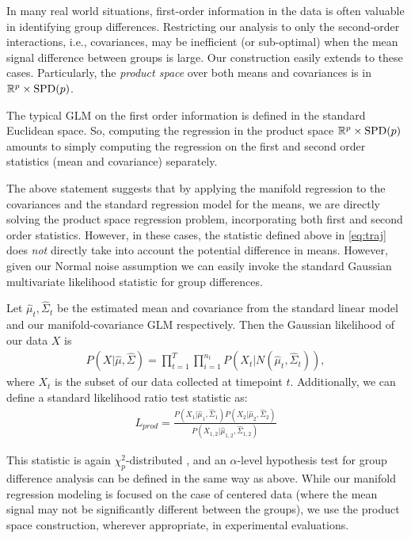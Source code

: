In many real world situations, first-order information in the data is often valuable in identifying group differences. Restricting 
our analysis to only the second-order interactions, i.e., covariances, may be inefficient (or sub-optimal) when the mean signal difference between groups is large. Our construction easily extends to these cases. Particularly, the \textit{product space} over both means and covariances is in $\mathbb{R}^{p} \times \text{SPD}{(p)}$. 
\begin{remark}
The typical GLM on the first order information is defined in the standard Euclidean space. So, computing the regression in the product space 
$\mathbb{R}^{p} \times \text{SPD}{(p)}$ 
amounts to simply 
computing the regression on the first and second order statistics (mean and covariance) separately.
\end{remark}
The above statement suggests that by applying the manifold regression to the covariances and the standard regression model for the means, 
we are directly solving the product space regression problem, incorporating both first and second order statistics.
However, in these cases, the statistic defined above in \eqref{eq:traj} does {\em not} directly take into account the potential difference in means. 
However, given our Normal noise assumption we can easily invoke the standard Gaussian multivariate likelihood statistic for group differences.
\begin{definition}
Let $\hat{\mu}_t, \hat{\Sigma}_t$ be the estimated mean and covariance from the standard linear model and our manifold-covariance GLM respectively. Then the Gaussian likelihood of our data $X$ is
\begin{align}
P(X|\hat{\mu},\hat{\Sigma}) = \prod_{t=1}^{T}\prod_{i=1}^{n_t} P(X_t | N(\hat{\mu}_t,\hat{\Sigma}_t)),
\end{align}
where $X_t$ is the subset of our data collected at timepoint $t$. Additionally, we can define a standard likelihood ratio test statistic as:
\begin{align}
L_{prod} = \frac{P(X_1|\hat{\mu}_1,\hat{\Sigma}_1)P(X_2|\hat{\mu}_2,\hat{\Sigma}_2)}{P(X_{1,2}|\hat{\mu}_{1,2},\hat{\Sigma}_{1,2})}
\end{align}
\end{definition}
This statistic is again $\chi^2_{p}$-distributed \cite{seber2003linear}, and an $\alpha$-level hypothesis test for group difference analysis 
can be defined in the same way as above. While our manifold regression modeling is focused on the case of centered data (where the mean signal may not be 
significantly different between the groups), we use the product space construction, wherever appropriate, in experimental evaluations.
